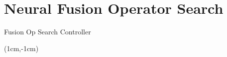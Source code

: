 \documentclass{beamer}
\begin{document}




\section{Neural Fusion Operator Search}

{%
\begin{frame}{Fusion Op Search Controller}
\centering
\hspace*{-1.0cm}
\begin{textblock*}{10cm}(1cm,-1cm)
\scalebox{1.3}{%

}
\end{textblock*}
\end{frame}
}

\end{document}
